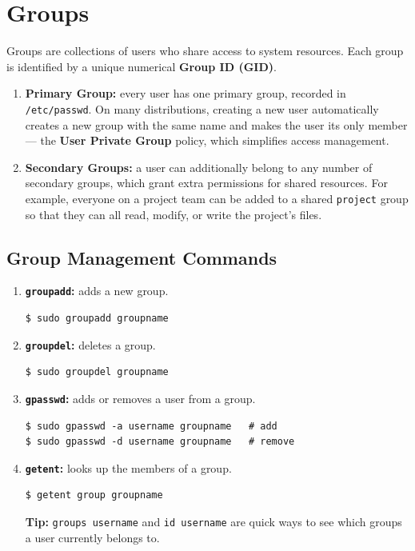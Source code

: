 \section{Groups}
Groups are collections of users who share access to system resources. Each group is identified by a unique numerical \textbf{Group ID (GID)}.

\begin{enumerate}
    \item \textbf{Primary Group:} every user has one primary group, recorded in \texttt{/etc/passwd}. On many distributions, creating a new user automatically creates a new group with the same name and makes the user its only member — the \textbf{User Private Group} policy, which simplifies access management.
    \item \textbf{Secondary Groups:} a user can additionally belong to any number of secondary groups, which grant extra permissions for shared resources. For example, everyone on a project team can be added to a shared \texttt{project} group so that they can all read, modify, or write the project's files.
\end{enumerate}

\subsection{Group Management Commands}
\begin{enumerate}
    \item \textbf{\texttt{groupadd}:} adds a new group.
\begin{lstlisting}[language=Terminal]
$ sudo groupadd groupname
\end{lstlisting}
    \item \textbf{\texttt{groupdel}:} deletes a group.
\begin{lstlisting}[language=Terminal]
$ sudo groupdel groupname
\end{lstlisting}
    \item \textbf{\texttt{gpasswd}:} adds or removes a user from a group.
\begin{lstlisting}[language=Terminal]
$ sudo gpasswd -a username groupname   # add
$ sudo gpasswd -d username groupname   # remove
\end{lstlisting}
    \item \textbf{\texttt{getent}:} looks up the members of a group.
\begin{lstlisting}[language=Terminal]
$ getent group groupname
\end{lstlisting}
    \textbf{Tip:} \texttt{groups username} and \texttt{id username} are quick ways to see which groups a user currently belongs to.
\end{enumerate}

